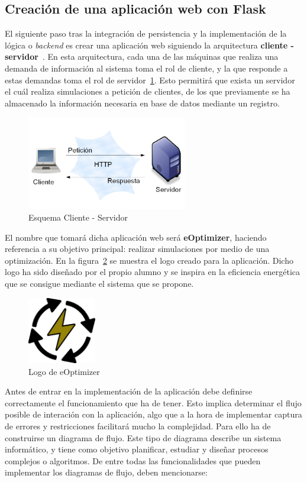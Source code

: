 \subsection{Creación de una aplicación web con Flask}
El siguiente paso tras la integración de persistencia y la implementación de la lógica o \textit{backend} es crear una aplicación web siguiendo la arquitectura \textbf{cliente - servidor}~\cite{Goer04}. En esta arquitectura, cada una de las máquinas que realiza una demanda de información al sistema toma el rol de cliente, y la que responde a estas demandas toma el rol de servidor~\ref{fig:client-server}. Esto permitirá que exista un servidor el cuál realiza simulaciones a petición de clientes, de los que previamente se ha almacenado la información necesaria en base de datos mediante un registro.
\begin{figure}[!h]
            \centering
            \includegraphics[width=7cm]{figs/client-server.png}
            \caption{Esquema Cliente - Servidor}
            \label{fig:client-server}
\end{figure}
El nombre que tomará dicha aplicación web será \textbf{eOptimizer}, haciendo referencia a su objetivo principal: realizar simulaciones por medio de una optimización. En la figura~\ref{fig:logo} se muestra el logo creado para la aplicación. Dicho logo ha sido diseñado por el propio alumno y se inspira en la eficiencia energética que se consigue mediante el sistema que se propone.
\begin{figure}[!h]
            \centering
            \includegraphics[width=3cm]{figs/logo.png}
            \caption{Logo de eOptimizer}
            \label{fig:logo}
\end{figure}
Antes de entrar en la implementación de la aplicación debe definirse correctamente el funcionamiento que ha de tener. Esto implica determinar el flujo posible de interación con la aplicación, algo que a la hora de implementar captura de errores y restricciones facilitará mucho la complejidad. Para ello ha de construirse un diagrama de flujo. Este tipo de diagrama describe un sistema informático, y tiene como objetivo planificar, estudiar y diseñar procesos complejos o algoritmos. De entre todas las funcionalidades que pueden implementar los diagramas de flujo, deben mencionarse:
